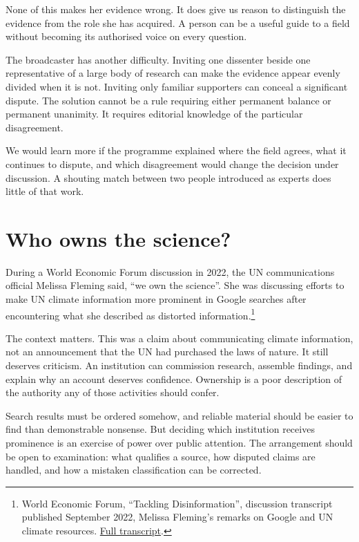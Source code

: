 \documentclass[12pt,a4paper]{book}
\begin{document}
None of this makes her evidence wrong. It does give us reason to distinguish the evidence from the role she has acquired. A person can be a useful guide to a field without becoming its authorised voice on every question.

The broadcaster has another difficulty. Inviting one dissenter beside one representative of a large body of research can make the evidence appear evenly divided when it is not. Inviting only familiar supporters can conceal a significant dispute. The solution cannot be a rule requiring either permanent balance or permanent unanimity. It requires editorial knowledge of the particular disagreement.

We would learn more if the programme explained where the field agrees, what it continues to dispute, and which disagreement would change the decision under discussion. A shouting match between two people introduced as experts does little of that work.

\section*{Who owns the science?}

During a World Economic Forum discussion in 2022, the UN communications official Melissa Fleming said, ``we own the science''. She was discussing efforts to make UN climate information more prominent in Google searches after encountering what she described as distorted information.\footnote{World Economic Forum, ``Tackling Disinformation'', discussion transcript published September 2022, Melissa Fleming's remarks on Google and UN climate resources. \href{https://www.weforum.org/stories/industries-in-depth/tackling-disinformation-agenda-dialogues/}{Full transcript}.}

The context matters. This was a claim about communicating climate information, not an announcement that the UN had purchased the laws of nature. It still deserves criticism. An institution can commission research, assemble findings, and explain why an account deserves confidence. Ownership is a poor description of the authority any of those activities should confer.

Search results must be ordered somehow, and reliable material should be easier to find than demonstrable nonsense. But deciding which institution receives prominence is an exercise of power over public attention. The arrangement should be open to examination: what qualifies a source, how disputed claims are handled, and how a mistaken classification can be corrected.
\end{document}
